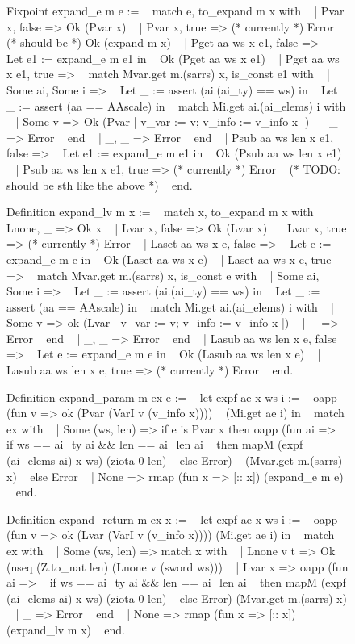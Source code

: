 \documentclass{article}
\begin{document}
\begin{figure} %
\obeylines\obeyspaces\ttfamily%
Fixpoint expand\_e m e := 
~ match e, to\_expand m x with
~ | Pvar x, false => Ok (Pvar x)
~ | Pvar x, true => (* currently *) Error
~   (* should be *) Ok (expand m x)
~ | Pget aa ws x e1, false =>
~   Let e1 := expand\_e m e1 in
~   Ok (Pget aa ws x e1)
~ | Pget aa ws x e1, true => %
~   match Mvar.get m.(sarrs) x, is\_const e1 with
~   | Some ai, Some i =>
~     Let \_ := assert (ai.(ai\_ty) == ws) in
~     Let \_ := assert (aa == AAscale) in
~     match Mi.get ai.(ai\_elems) i with
~     | Some v => Ok (Pvar {| v\_var := v; v\_info := v\_info x |})
~     | \_ => Error
~     end 
~   | \_, \_ => Error
~   end
~ | Psub aa ws len x e1, false =>
~   Let e1 := expand\_e m e1 in
~   Ok (Psub aa ws len x e1)
~ | Psub aa ws len x e1, true => (* currently *) Error
~   (* TODO: should be sth like the above *)
~ end.

Definition expand\_lv m x :=
~ match x, to\_expand m x with
~ | Lnone, \_ => Ok x
~ | Lvar x, false => Ok (Lvar x)
~ | Lvar x, true => (* currently *) Error
~ | Laset aa ws x e, false =>
~   Let e := expand\_e m e in
~   Ok (Laset aa ws x e)
~ | Laset aa ws x e, true => %
~   match Mvar.get m.(sarrs) x, is\_const e with
~   | Some ai, Some i =>
~     Let \_ := assert (ai.(ai\_ty) == ws) in
~     Let \_ := assert (aa == AAscale) in
~     match Mi.get ai.(ai\_elems) i with
~     | Some v => ok (Lvar {| v\_var := v; v\_info := v\_info x |})
~     | \_ => Error
~     end 
~   | \_, \_ => Error
~   end
~ | Lasub aa ws len x e, false =>
~   Let e := expand\_e m e in
~   Ok (Lasub aa ws len x e)
~ | Lasub aa ws len x e, true => (* currently *) Error
~ end.

Definition expand\_param m ex e :=
~ let expf ae x ws i :=
~   oapp (fun v => ok (Pvar (VarI v (v\_info x))))
~     (Mi.get ae i) in
~ match ex with
~ | Some (ws, len) => if e is Pvar x then oapp (fun ai =>
~       if ws == ai\_ty ai \&\& len == ai\_len ai
~       then mapM (expf (ai\_elems ai) x ws) (ziota 0 len)
~       else Error)
~     (Mvar.get m.(sarrs) x)
~   else Error
~ | None => rmap (fun x => [:: x]) (expand\_e m e)
~ end.

Definition expand\_return m ex x :=
~ let expf ae x ws i :=
~   oapp (fun v => ok (Lvar (VarI v (v\_info x)))) (Mi.get ae i) in
~ match ex with
~ | Some (ws, len) => match x with
~   | Lnone v t => Ok (nseq (Z.to\_nat len) (Lnone v (sword ws)))
~   | Lvar x => oapp (fun ai =>
~     if ws == ai\_ty ai \&\& len == ai\_len ai
~     then mapM (expf (ai\_elems ai) x ws) (ziota 0 len)
~     else Error) (Mvar.get m.(sarrs) x)
~   | \_ => Error
~   end
~ | None => rmap (fun x => [:: x]) (expand\_lv m x)
~ end.


\end{figure}
\end{document}
